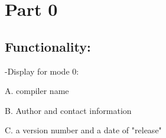 \documentclass{article}
\begin{document}
\newpage
\section{Part 0}

\subsection{Functionality:}
    \par{-Display for mode 0:}
        \setlength{\parindent}{2em}
        \par{   A. compiler name}
        \par{   B. Author and contact information}
        \par{   C. a version number and a date of "release"}
\end{document}
